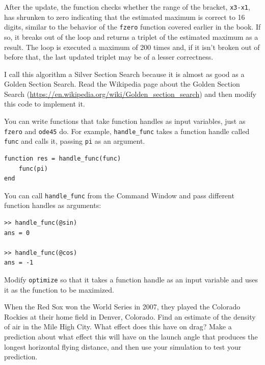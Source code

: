 \documentclass[
]{book}
\begin{document}
After the update, 
the function checks whether the range of the bracket, {\tt x3-x1}, has 
shrunken to zero indicating that the estimated maximum is correct to 16 
digits, similar to the behavior of the {\tt fzero} function covered earlier
in the book. 
If so, it breaks out of
the loop and returns a triplet of the estimated maximum as a result.  
The loop is executed a maximum of 200 times and, if it isn't broken
out of before that, the last updated triplet may be of a lesser
correctness.

\begin{ex}
I call this algorithm a Silver Section Search because it is almost as
good as a Golden Section Search.  Read the Wikipedia page about the
Golden Section Search
(\url{https://en.wikipedia.org/wiki/Golden_section_search}) and then
modify this code to implement it.
\end{ex}

\begin{ex}
You can write functions that take function handles as input
variables, just as {\tt fzero} and {\tt ode45} do.
For example, {\tt handle\_func} takes a function handle called
{\tt func} and calls it, passing {\tt pi} as an argument.

\begin{verbatim}
function res = handle_func(func)
    func(pi)
end
\end{verbatim}

You can call {\tt handle\_func} from the Command Window and pass
different function handles as arguments:

\begin{verbatim}
>> handle_func(@sin)
ans = 0

>> handle_func(@cos)
ans = -1
\end{verbatim}

Modify {\tt optimize} so that it takes a function handle
as an input variable and uses it as the function to be
maximized.
\end{ex}

\begin{ex}
When the Red Sox won the World Series in 2007, they played the
Colorado Rockies at their home field in Denver, Colorado.  Find an
estimate of the density of air in the Mile High City.  What effect
does this have on drag?  Make a prediction about what effect this will
have on the launch angle that produces the longest horizontal flying
distance, and then use your simulation to test
your prediction.
\end{ex}
\end{document}

